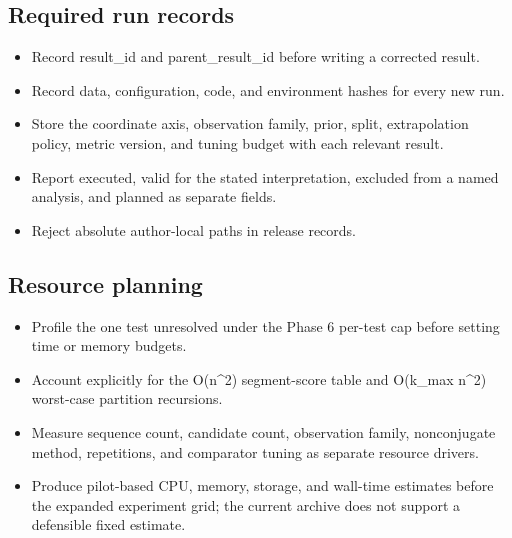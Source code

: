 \subsection{Required run records}
\begin{itemize}[leftmargin=1.7em,itemsep=1.5pt,topsep=2pt]
\item Record result\_id and parent\_result\_id before writing a corrected result.
\item Record data, configuration, code, and environment hashes for every new run.
\item Store the coordinate axis, observation family, prior, split, extrapolation policy, metric version, and tuning budget with each relevant result.
\item Report executed, valid for the stated interpretation, excluded from a named analysis, and planned as separate fields.
\item Reject absolute author-local paths in release records.
\end{itemize}
\subsection{Resource planning}
\begin{itemize}[leftmargin=1.7em,itemsep=1.5pt,topsep=2pt]
\item Profile the one test unresolved under the Phase 6 per-test cap before setting time or memory budgets.
\item Account explicitly for the O(n\textasciicircum{}2) segment-score table and O(k\_max n\textasciicircum{}2) worst-case partition recursions.
\item Measure sequence count, candidate count, observation family, nonconjugate method, repetitions, and comparator tuning as separate resource drivers.
\item Produce pilot-based CPU, memory, storage, and wall-time estimates before the expanded experiment grid; the current archive does not support a defensible fixed estimate.
\end{itemize}

